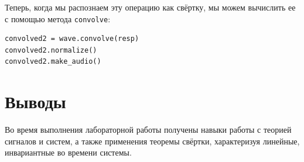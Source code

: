 \documentclass[a4paper,12pt]{report}
\begin{document}
Теперь, когда мы распознаем эту операцию как свёртку, мы можем вычислить ее с помощью метода \texttt{convolve}:

\begin{lstlisting}[caption=Моделирование при помощи \texttt{convolve}]
convolved2 = wave.convolve(resp)
convolved2.normalize()
convolved2.make_audio()
\end{lstlisting}

\chapter{Выводы}

Во время выполнения лабораторной работы получены навыки работы с теорией сигналов и систем, а также применения теоремы свёртки, характеризуя линейные, инвариантные во времени системы.
\end{document}
